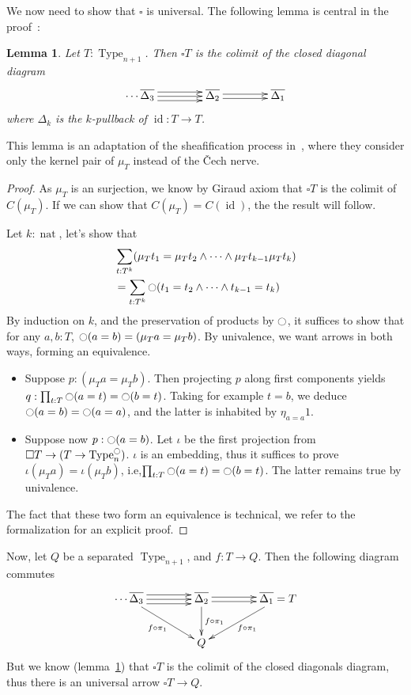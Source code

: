 \documentclass[conference]{IEEEtran}
\makeatletter
\newtheorem{lem}[thm]{Lemma}
\newcommand{\ie}{i.e,\xspace}
\def\dar[#1]#2{\ar@<-#2>[#1]\ar@<#2>[#1]} %
\def\tar[#1]#2{\ar@<#2>[#1]\ar@<0pt>[#1]\ar@<-#2>[#1]} %
\DeclareMathOperator{\Type}{Type}
\DeclareMathOperator{\nat}{nat}
\DeclareMathOperator{\id}{id}
\newcommand{\modal}{\ensuremath{\ocircle}}
\makeatother
\begin{document}
We now need to show that $\square$ is universal. The following
lemma is central in the proof~:
\begin{lem}\label{lem:sepiscolim}
  Let $T:\Type_{n+1}$. Then $\square T$ is the colimit of the closed
  diagonal diagram
  $$\xymatrix @C=4em  { 
    \cdots \overline{\Delta_3} \tar[r]{4pt} & \overline{\Delta_2} \dar[r]{2pt} &
    \overline{\Delta_1}
  }$$
where $\Delta_k$ is the $k$-pullback of $\id : T \to T$.
\end{lem}

This lemma is an adaptation of the sheafification process
in~\cite{maclanemoerdijk}, where they consider only the kernel pair of
$\mu_T$ instead of the \v{C}ech nerve.

\begin{proof}
  As $\mu_T$ is an surjection, we know by Giraud axiom that $\square T$ is the colimit
  of $C(\mu_T)$. If we can show that $C(\mu_T) = C(\id)$, the the
  result will follow. 

  Let $k:\nat$, let's show that 
  \begin{align*}
    &\sum_{t:T^k} (\mu_T t_1 = \mu_T t_2 \land \cdots
      \land \mu_T t_{k-1} \mu_T t_k)\\
    &= \sum_{t:T^k} \modal (t_1 = t_2 \land \cdots
      \land t_{k-1} = t_k)
  \end{align*}
By induction on $k$, and the preservation of products by $\modal$, it
suffices to show that for any $a,b:T$, $\modal (a=b) = (\mu_T a =
\mu_T b)$. By univalence, we want arrows in both ways, forming an
equivalence.
\begin{itemize}
\item Suppose $p : (\mu_T a = \mu_T b)$. Then projecting $p$ along
  first components yields $q : \prod_{t:T} \modal(a=t) = \modal (b=t)
  $.
  Taking for example $t=b$, we deduce $\modal (a=b) = \modal(a=a)$,
  and the latter is inhabited by $\eta_{a=a} 1$.
\item Suppose now $p : \modal(a=b)$. Let $\iota$ be the first
  projection from $\square T \to (T \to \Type_n^\modal)$. $\iota$ is
  an embedding, thus it suffices to prove $\iota (\mu_T a) = \iota
  (\mu_T b)$, \ie $\prod_{t:T}\modal (a=t) = \modal (b=t)$. The latter
  remains true by univalence.
\end{itemize}
The fact that these two form an equivalence is technical, we refer to
the formalization for an explicit proof.
\end{proof}

Now, let $Q$ be a separated $\Type_{n+1}$, and $f:T \to Q$. Then the
following diagram commutes
$$\xymatrix @C=4em{ 
    \cdots \overline{\Delta_3} \tar[r]{4pt} \ar[rd]_{f\circ \pi_1} & \overline{\Delta_2}
    \dar[r]{2pt} \ar[d]^{f\circ \pi_1} &
    \overline{\Delta_1} = T \ar[ld]^{f\circ \pi_1}\\
    & Q &
  }$$
But we know (lemma~\ref{lem:sepiscolim}) that $\square T$ is the
colimit of the closed diagonals diagram, thus there is an universal
arrow $\square T \to Q$.
\end{document}
